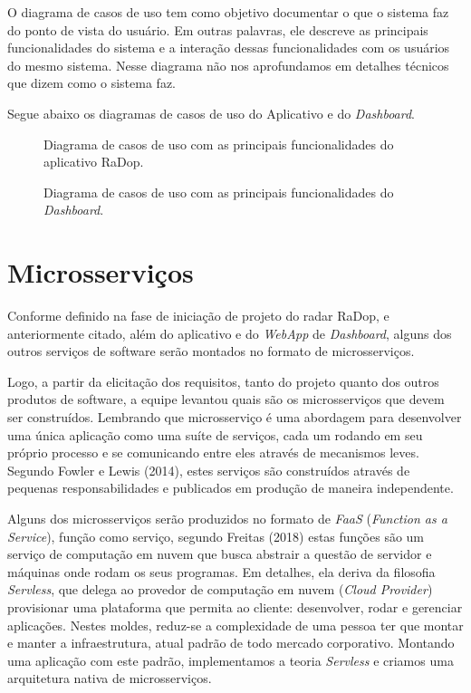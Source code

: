 O diagrama de casos de uso tem como objetivo documentar o que o sistema faz do ponto de vista do usuário. Em outras palavras, ele descreve as principais funcionalidades do sistema e a interação dessas funcionalidades com os usuários do mesmo sistema. Nesse diagrama não nos aprofundamos em detalhes técnicos que dizem como o sistema faz.

Segue abaixo os diagramas de casos de uso do Aplicativo e do \textit{Dashboard}.

\begin{figure}[ht]
	\caption{\label{fig:casos_de_uso} Diagrama de casos de uso com as principais funcionalidades do aplicativo RaDop.}
\end{figure}

\begin{figure}[ht]
	\caption{\label{fig:diagrama-comm-soft} Diagrama de casos de uso com as principais funcionalidades do \textit{Dashboard}.}
\end{figure}


\section{Microsserviços}

Conforme definido na fase de iniciação de projeto do radar RaDop, e anteriormente citado, além do aplicativo e do \textit{WebApp} de \textit{Dashboard}, alguns dos outros serviços de software serão montados no formato de microsserviços. 

Logo, a partir da elicitação dos requisitos, tanto do projeto quanto dos outros produtos de software, a equipe levantou quais são os microsserviços que devem ser construídos. Lembrando que microsserviço é uma abordagem para desenvolver uma única aplicação como uma suíte de serviços, cada um rodando em seu próprio processo e se comunicando entre eles através de mecanismos leves. Segundo Fowler e Lewis (2014), estes serviços são construídos através de pequenas responsabilidades e publicados em produção de maneira independente. 

Alguns dos microsserviços serão produzidos no formato de \textit{FaaS} (\textit{Function as a Service}), função como serviço, segundo Freitas (2018) estas funções são um serviço de computação em nuvem que busca abstrair a questão de servidor e máquinas onde rodam os seus programas. Em detalhes, ela deriva da filosofia \textit{Servless}, que delega ao provedor de computação em nuvem (\textit{Cloud Provider}) provisionar uma plataforma que permita ao cliente: desenvolver, rodar e gerenciar aplicações. Nestes moldes, reduz-se a complexidade de uma pessoa ter que montar e manter a infraestrutura, atual padrão de todo mercado corporativo. Montando uma aplicação com este padrão, implementamos a teoria \textit{Servless} e criamos uma arquitetura nativa de microsserviços.


